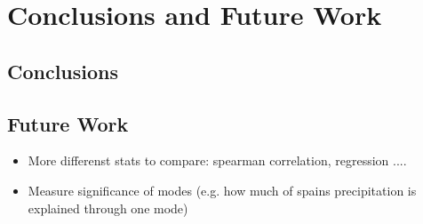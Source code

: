 \chapter{Conclusions and Future Work}
\label{ch:conclusions}

\section{Conclusions}
\label{sec:conclusions}



\section{Future Work}
\label{sec:FutureWork}

\begin{itemize}
  \item More differenst stats to compare: spearman correlation, regression ....
  \item Measure significance of modes (e.g. how much of spains precipitation is explained through one mode)

\end{itemize}
